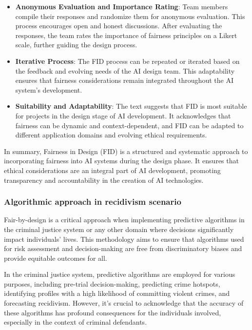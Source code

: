 \documentclass{article}
\begin{document}
\begin{itemize}
    \item \textbf{Anonymous Evaluation and Importance Rating}: Team members compile their responses and randomize them for anonymous evaluation. This process encourages open and honest discussions. After evaluating the responses, the team rates the importance of fairness principles on a Likert scale, further guiding the design process.
    
    \item \textbf{Iterative Process}: The FID process can be repeated or iterated based on the feedback and evolving needs of the AI design team. This adaptability ensures that fairness considerations remain integrated throughout the AI system's development.
    
    \item \textbf{Suitability and Adaptability}: The text suggests that FID is most suitable for projects in the design stage of AI development. It acknowledges that fairness can be dynamic and context-dependent, and FID can be adapted to different application domains and evolving ethical requirements.

\end{itemize}

In summary, Fairness in Design (FID) is a structured and systematic approach to incorporating fairness into AI systems during the design phase. It ensures that ethical considerations are an integral part of AI development, promoting transparency and accountability in the creation of AI technologies.

\subsubsection{Algorithmic approach in recidivism scenario}

Fair-by-design is a critical approach when implementing predictive algorithms in the criminal justice\cite{Soares2019FairbydesignEM} system or any other domain where decisions significantly impact individuals' lives. This methodology aims to ensure that algorithms used for risk assessment and decision-making are free from discriminatory biases and provide equitable outcomes for all.  

In the criminal justice system, predictive algorithms are employed for various purposes, including pre-trial decision-making, predicting crime hotspots, identifying profiles with a high likelihood of committing violent crimes, and forecasting recidivism. However, it's crucial to acknowledge that the accuracy of these algorithms has profound consequences for the individuals involved, especially in the context of criminal defendants.  
\end{document}
